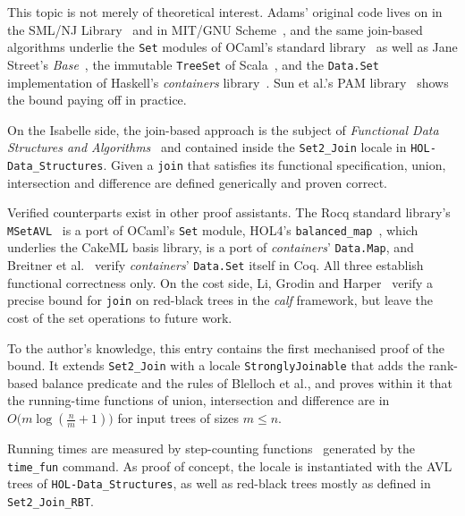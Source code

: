 \documentclass[11pt,a4paper]{article}
\begin{document}
This topic is not merely of theoretical interest. Adams' original 
code lives on in the SML/NJ Library~\cite{smlnjlib} and in MIT/GNU 
Scheme~\cite{mitscheme}, and the same join-based algorithms underlie the 
\texttt{Set} modules of OCaml's standard library~\cite{ocamlset} as well as 
Jane Street's \emph{Base}~\cite{base}, the immutable \texttt{TreeSet} of 
Scala~\cite{scalatree}, and the \texttt{Data.Set}
implementation of Haskell's \emph{containers} library~\cite{containers}.
Sun et al.'s PAM library~\cite{pamlib,sun2018pam} shows the bound
paying off in practice.

On the Isabelle side, the join-based approach is the subject of
\emph{Functional Data Structures and
Algorithms}~\cite[Chapter~10]{fdsa} and contained inside the \texttt{Set2\_Join} 
locale in \texttt{HOL-Data\_Structures}. Given a \texttt{join} that
satisfies its functional specification, union, intersection and
difference are defined generically and proven correct.

Verified counterparts exist in other proof assistants. The Rocq standard
library's \texttt{MSetAVL}~\cite{msetavl} is a port of OCaml's \texttt{Set}
module, HOL4's \texttt{balanced\_map}~\cite{hol4bmap}, which underlies the
CakeML basis library, is a port of \emph{containers}' \texttt{Data.Map}, and
Breitner et al.~\cite{breitner2018ready} verify \emph{containers}'
\texttt{Data.Set} itself in Coq. All three establish functional correctness
only. On the cost side, Li, Grodin and
Harper~\cite{li2023calf} verify a precise bound for \texttt{join} on
red-black trees in the \emph{calf} framework, but leave the cost of the set
operations to future work. 

To the author's knowledge, this entry contains the first
mechanised proof of the bound. It extends \texttt{Set2\_Join} with a
locale \texttt{StronglyJoinable} that adds the rank-based balance predicate
and the rules of Blelloch et al., and proves within it that the running-time
functions of union, intersection and difference are in
$O\bigl(m \log(\frac{n}{m} + 1)\bigr)$ for input trees of sizes $m \le n$.

Running times are measured by
step-counting functions~\cite[Section~1.5]{fdsa} generated by the
\texttt{time\_fun} command.
As proof of concept, the locale is instantiated
with the AVL trees of \texttt{HOL-Data\_Structures}, as well as red-black trees 
mostly as defined in \texttt{Set2\_Join\_RBT}.











\appendix





\end{document}

